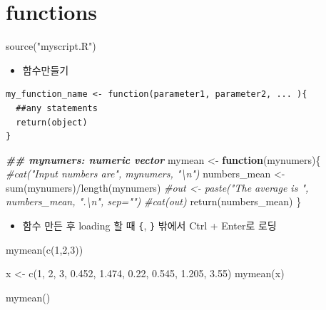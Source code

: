 \documentclass[
]{book}
\newenvironment{Shaded}{\begin{snugshade}}{\end{snugshade}}
\newcommand{\CommentTok}[1]{\textcolor[rgb]{0.56,0.35,0.01}{\textit{#1}}}
\newcommand{\ControlFlowTok}[1]{\textcolor[rgb]{0.13,0.29,0.53}{\textbf{#1}}}
\newcommand{\DecValTok}[1]{\textcolor[rgb]{0.00,0.00,0.81}{#1}}
\newcommand{\DocumentationTok}[1]{\textcolor[rgb]{0.56,0.35,0.01}{\textbf{\textit{#1}}}}
\newcommand{\FloatTok}[1]{\textcolor[rgb]{0.00,0.00,0.81}{#1}}
\newcommand{\FunctionTok}[1]{\textcolor[rgb]{0.00,0.00,0.00}{#1}}
\newcommand{\NormalTok}[1]{#1}
\newcommand{\OtherTok}[1]{\textcolor[rgb]{0.56,0.35,0.01}{#1}}
\newcommand{\SpecialCharTok}[1]{\textcolor[rgb]{0.00,0.00,0.00}{#1}}
\newcommand{\StringTok}[1]{\textcolor[rgb]{0.31,0.60,0.02}{#1}}
\providecommand{\tightlist}{%
  \setlength{\itemsep}{0pt}\setlength{\parskip}{0pt}}
\begin{document}
\hypertarget{functions-1}{%
\section{functions}\label{functions-1}}

\begin{Shaded}
\begin{Highlighting}[]
\FunctionTok{source}\NormalTok{(}\StringTok{"myscript.R"}\NormalTok{)}
\end{Highlighting}
\end{Shaded}

\begin{itemize}
\tightlist
\item
  함수만들기
\end{itemize}

\begin{verbatim}
my_function_name <- function(parameter1, parameter2, ... ){
  ##any statements
  return(object)
}
\end{verbatim}

\begin{Shaded}
\begin{Highlighting}[]

\DocumentationTok{\#\# mynumers: numeric vector}
\NormalTok{mymean }\OtherTok{\textless{}{-}} \ControlFlowTok{function}\NormalTok{(mynumers)\{}
  \CommentTok{\#cat("Input numbers are", mynumers, "\textbackslash{}n")}
\NormalTok{  numbers\_mean }\OtherTok{\textless{}{-}} \FunctionTok{sum}\NormalTok{(mynumers)}\SpecialCharTok{/}\FunctionTok{length}\NormalTok{(mynumers)}
  \CommentTok{\#out \textless{}{-} paste("The average is ", numbers\_mean, ".\textbackslash{}n", sep="")}
  \CommentTok{\#cat(out)}
  \FunctionTok{return}\NormalTok{(numbers\_mean)}
\NormalTok{\}}
\end{Highlighting}
\end{Shaded}

\begin{itemize}
\tightlist
\item
  함수 만든 후 loading 할 때 \texttt{\{}, \texttt{\}} 밖에서 Ctrl + Enter로 로딩
\end{itemize}

\begin{Shaded}
\begin{Highlighting}[]
\FunctionTok{mymean}\NormalTok{(}\FunctionTok{c}\NormalTok{(}\DecValTok{1}\NormalTok{,}\DecValTok{2}\NormalTok{,}\DecValTok{3}\NormalTok{))}

\NormalTok{x }\OtherTok{\textless{}{-}} \FunctionTok{c}\NormalTok{(}\DecValTok{1}\NormalTok{, }\DecValTok{2}\NormalTok{, }\DecValTok{3}\NormalTok{, }\FloatTok{0.452}\NormalTok{, }\FloatTok{1.474}\NormalTok{, }\FloatTok{0.22}\NormalTok{, }\FloatTok{0.545}\NormalTok{, }\FloatTok{1.205}\NormalTok{, }\FloatTok{3.55}\NormalTok{)}
\FunctionTok{mymean}\NormalTok{(x)}

\FunctionTok{mymean}\NormalTok{()}
\end{Highlighting}
\end{Shaded}
\end{document}

